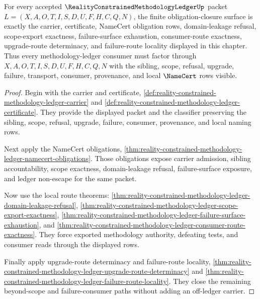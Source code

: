 \begin{theorem}
\label{thm:reality-constrained-methodology-ledger-obligation-closure-package}
For every accepted $\RealityConstrainedMethodologyLedgerUp$ packet
$L=(X,A,O,T,I,S,D,U,F,H,C,Q,N)$, the finite obligation-closure surface is exactly
the carrier, certificate, NameCert obligation rows, domain-leakage refusal,
scope-export exactness, failure-surface exhaustion, consumer-route exactness,
upgrade-route determinacy, and failure-route locality displayed in this
chapter. Thus every methodology-ledger consumer must factor through
$X,A,O,T,I,S,D,U,F,H,C,Q,N$ with the sibling, scope, refusal, upgrade,
failure, transport, consumer, provenance, and local $\NameCert$ rows visible.
\end{theorem}
\begin{proof}
Begin with the carrier and certificate,
\autoref{def:reality-constrained-methodology-ledger-carrier} and
\autoref{def:reality-constrained-methodology-ledger-certificate}. They provide
the displayed packet and the classifier preserving the sibling, scope,
refusal, upgrade, failure, consumer, provenance, and local naming rows.

Next apply the NameCert obligations,
\autoref{thm:reality-constrained-methodology-ledger-namecert-obligations}.
Those obligations expose carrier admission, sibling accountability, scope
exactness, domain-leakage refusal, failure-surface exposure, and ledger
non-escape for the same packet.

Now use the local route theorems:
\autoref{thm:reality-constrained-methodology-ledger-domain-leakage-refusal},
\autoref{thm:reality-constrained-methodology-ledger-scope-export-exactness},
\autoref{thm:reality-constrained-methodology-ledger-failure-surface-exhaustion},
and
\autoref{thm:reality-constrained-methodology-ledger-consumer-route-exactness}.
They force exported methodology authority, defeating tests, and consumer reads
through the displayed rows.

Finally apply upgrade-route determinacy and failure-route locality,
\autoref{thm:reality-constrained-methodology-ledger-upgrade-route-determinacy}
and
\autoref{thm:reality-constrained-methodology-ledger-failure-route-locality}.
They close the remaining beyond-scope and failure-consumer paths without
adding an off-ledger carrier.
\end{proof}

